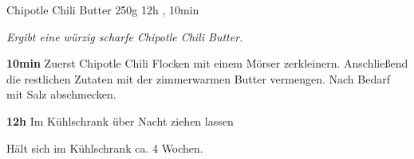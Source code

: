 \begin{recipe}{Chipotle Chili Butter} {250g} {12h , 10min }

  \freeform{}\textit{Ergibt eine würzig scharfe Chipotle Chili Butter.}


  \textbf{10min}
  Zuerst Chipotle Chili Flocken mit einem Mörser zerkleinern.
  Anschließend die restlichen Zutaten mit der zimmerwarmen Butter vermengen.
  Nach Bedarf mit Salz abschmecken.

  \newstep{}\textbf{12h}
  Im Kühlschrank über Nacht ziehen lassen

  \freeform{}\hrulefill{}

  \freeform{}
  Hält sich im Kühlschrank ca. 4 Wochen.

\end{recipe}
